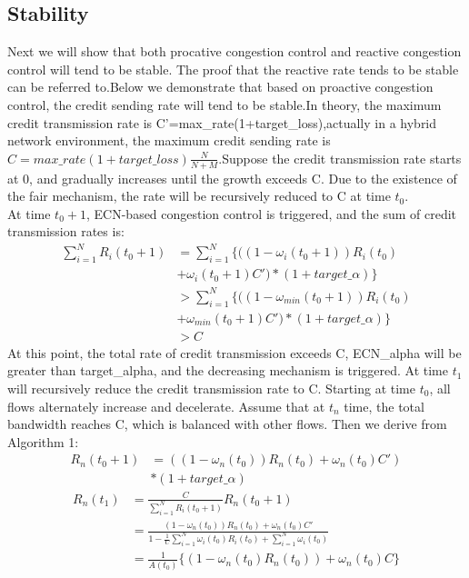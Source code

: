 \documentclass[conference]{IEEEtran}
\begin{document}
\subsection{Stability}
Next we will show that both procative congestion control and reactive congestion control will tend to be stable. The proof that the reactive rate tends to be stable can be referred to\cite{Alizadeh2010Data}.Below we demonstrate that based on proactive congestion control, the credit sending rate will tend to be stable.In theory, the maximum credit transmission rate is C'=max\_rate(1+target\_loss),actually in a hybrid network environment, the maximum credit sending rate is $C=max\_rate(1+target\_loss)\frac{N}{N + M}$.Suppose the credit transmission rate starts at 0, and gradually increases until the growth exceeds C. Due to the existence of the fair mechanism, the rate will be recursively reduced to C at time $t_0$.\\
\indent At time $t_0+1$, ECN-based congestion control is triggered, and the sum of credit transmission rates is:
\begin{equation}
\begin{aligned}
\sum_{i = 1} ^N R_i(t_0 + 1)&=\sum_{i = 1}^N\lbrace((1-\omega_i (t_0 +1))R_i(t_0)\\
&+\omega_i(t_0 + 1)C')*(1+target\_\alpha) \rbrace\\
&>\sum_{i = 1}^N\lbrace((1-\omega_{min} (t_0 +1))R_i(t_0)\\
&+\omega_{min}(t_0 + 1)C')*(1+target\_\alpha) \rbrace\\
&>C
\end{aligned}
\end{equation}
At this point, the total rate of credit transmission exceeds C, ECN\_alpha will be greater than target\_alpha, and the decreasing mechanism is triggered. At time $t_1$ will recursively reduce the credit transmission rate to C.
Starting at time $t_0$, all flows alternately increase and decelerate. Assume that at $t_n$ time, the total bandwidth reaches C, which is balanced with other flows. Then we derive from Algorithm 1:
\begin{equation}
\begin{aligned}
R_n(t_0+1)&=((1-\omega_n(t_0))R_n(t_0)+\omega_n(t_0)C')\\
&*(1+target\_\alpha)
\end{aligned}
\end{equation}
\begin{equation}
\begin{aligned}
R_n(t_1)&=\frac{C}{\sum_{i=1}^N R_i(t_0+1)}R_n(t_0+1)\\
&=\frac{(1-\omega_n(t_0))R_n(t_0)+\omega_n(t_0)C'}{1-\frac{1}{C}\sum_{i=1}^N\omega_i(t_0)R_i(t_0)+\sum_{i=1}^N\omega_i(t_0)}\\
&=\frac{1}{A(t_0)}\lbrace (1-\omega_n(t_0)R_n(t_0))+\omega_n(t_0)C \rbrace
\end{aligned}
\end{equation}
\end{document}
